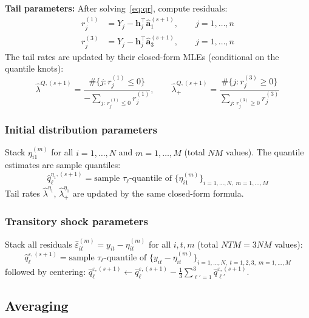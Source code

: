 \documentclass[12pt]{article}
\begin{document}
\medskip\noindent
\textbf{Tail parameters:}  After solving~\eqref{eq:qr}, compute residuals:
\begin{align}
r_j^{(1)} &= Y_j - \mathbf{h}_j^\top \hat{\mathbf{a}}_1^{(s+1)}, \qquad j=1,\dots,n \\
r_j^{(3)} &= Y_j - \mathbf{h}_j^\top \hat{\mathbf{a}}_3^{(s+1)}, \qquad j=1,\dots,n
\end{align}
The tail rates are updated by their closed-form MLEs (conditional on the quantile knots):
\begin{equation}
\hat\lambda^{Q,(s+1)} = \frac{\#\{j : r_j^{(1)} \le 0\}}{-\sum_{j:\, r_j^{(1)} \le 0} r_j^{(1)}}, \qquad
\hat\lambda_+^{Q,(s+1)} = \frac{\#\{j : r_j^{(3)} \ge 0\}}{\sum_{j:\, r_j^{(3)} \ge 0} r_j^{(3)}}
\end{equation}

\subsubsection{Initial distribution parameters}

Stack $\eta_{i1}^{(m)}$ for all $i=1,\dots,N$ and $m=1,\dots,M$ (total $NM$ values).  The quantile estimates are sample quantiles:
\begin{equation}
\hat{q}_\ell^{\eta_1,(s+1)} = \text{sample $\tau_\ell$-quantile of } \{\eta_{i1}^{(m)}\}_{i=1,\dots,N,\; m=1,\dots,M}
\end{equation}
Tail rates $\hat\lambda^{\eta_1}$, $\hat\lambda_+^{\eta_1}$ are updated by the same closed-form formula.

\subsubsection{Transitory shock parameters}

Stack all residuals $\hat\varepsilon_{it}^{(m)} = y_{it} - \eta_{it}^{(m)}$ for all $i,t,m$ (total $NTM = 3NM$ values):
\begin{equation}
\hat{q}_\ell^{\varepsilon,(s+1)} = \text{sample $\tau_\ell$-quantile of } \{y_{it} - \eta_{it}^{(m)}\}_{i=1,\dots,N,\; t=1,2,3,\; m=1,\dots,M}
\end{equation}
followed by centering: $\hat{q}_\ell^{\varepsilon,(s+1)} \leftarrow \hat{q}_\ell^{\varepsilon,(s+1)} - \frac{1}{3}\sum_{\ell'=1}^3 \hat{q}_{\ell'}^{\varepsilon,(s+1)}$.

\subsection{Averaging}
\end{document}
